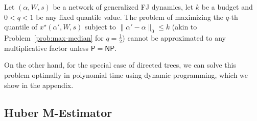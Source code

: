 \begin{corollary}
\label{cor:quantile}
Let $(\alpha, W, s)$ be a network of generalized FJ  dynamics,
let $k$ be a budget and $0 < q < 1$  be any fixed quantile value.
The problem of maximizing the $q$-th quantile of $x^\star(\alpha', W, s)$ subject to $\|\alpha' - \alpha\|_0 \le k$ (akin to Problem~\ref{prob:max-median} for $q=\frac{1}{2}$) cannot be approximated to any multiplicative factor unless $\mathsf{P} = \mathsf{NP}$.
\end{corollary}

On the other hand,
for the special case of directed trees,
we can solve this problem optimally
in polynomial time using dynamic programming,
which we show in the appendix.


\subsection{Huber M-Estimator}



